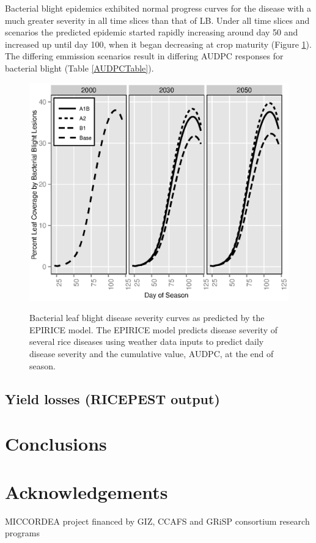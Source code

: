 \documentclass[preprint,12pt]{elsarticle}
\begin{document}
Bacterial blight epidemics exhibited normal progress curves for the disease with a much greater severity in all time slices than that of LB. Under all time slices and scenarios the predicted epidemic started rapidly increasing around day 50 and increased up until day 100, when it began decreasing at crop maturity (Figure \ref{BBCurves}). The differing emmission scenarios result in differing AUDPC responses for bacterial blight (Table \ref{AUDPCTable}).

\begin{figure}[H]
  \includegraphics[width = 140mm]{figures/BB}
  \label{BBCurves}
  \caption{Bacterial leaf blight disease severity curves as predicted by the EPIRICE model. The EPIRICE model predicts disease severity of several rice diseases using weather data inputs to predict daily disease severity and the cumulative value, AUDPC, at the end of season.}
\end{figure}

\subsection{Yield losses (RICEPEST output)}

\section{Conclusions}

\section{Acknowledgements}
MICCORDEA project financed by GIZ, CCAFS and GRiSP consortium research programs
\end{document}
